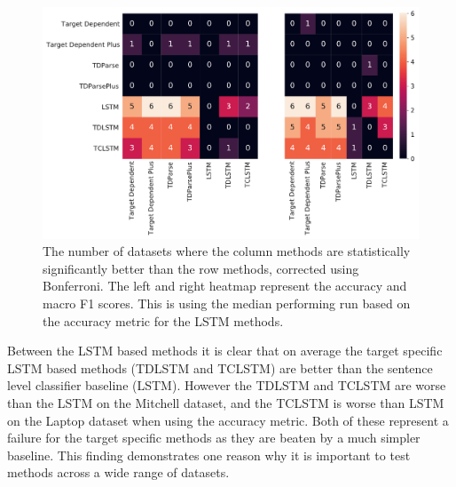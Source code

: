\begin{figure}[!h]
    \centering
    \includegraphics[scale=0.4]{images/reproducibility/Sig_Test.pdf}
    \caption{The number of datasets where the column methods are statistically significantly better than the row methods, corrected using Bonferroni. The left and right heatmap represent the accuracy and macro F1 scores. This is using the median performing run based on the accuracy metric for the LSTM methods.}
    \label{figure:repro_mass_eval_test_sig_results}
\end{figure}

Between the LSTM based methods it is clear that on average the target specific LSTM based methods (TDLSTM and TCLSTM) are better than the sentence level classifier baseline (LSTM). However the TDLSTM and TCLSTM are worse than the LSTM on the Mitchell dataset, and the TCLSTM is worse than LSTM on the Laptop dataset when using the accuracy metric. Both of these represent a failure for the target specific methods as they are beaten by a much simpler baseline. This finding demonstrates one reason why it is important to test methods across a wide range of datasets.

